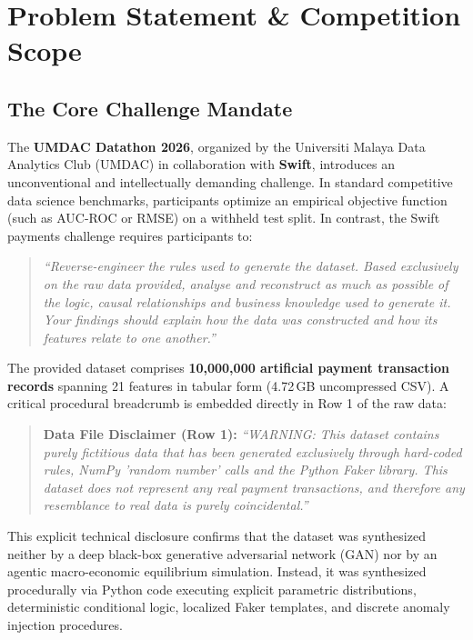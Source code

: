 \documentclass[11pt,a4paper]{article}
\begin{document}
\tableofcontents
\newpage

\section{Problem Statement \& Competition Scope}

\subsection{The Core Challenge Mandate}
The \textbf{UMDAC Datathon 2026}, organized by the Universiti Malaya Data Analytics Club (UMDAC) in collaboration with \textbf{Swift}, introduces an unconventional and intellectually demanding challenge. In standard competitive data science benchmarks, participants optimize an empirical objective function (such as AUC-ROC or RMSE) on a withheld test split. In contrast, the Swift payments challenge requires participants to:
\begin{quote}
\textit{``Reverse-engineer the rules used to generate the dataset. Based exclusively on the raw data provided, analyse and reconstruct as much as possible of the logic, causal relationships and business knowledge used to generate it. Your findings should explain how the data was constructed and how its features relate to one another.''}
\end{quote}

The provided dataset comprises \textbf{10,000,000 artificial payment transaction records} spanning 21 features in tabular form (4.72\,GB uncompressed CSV). A critical procedural breadcrumb is embedded directly in Row 1 of the raw data:
\begin{quote}
\textbf{Data File Disclaimer (Row 1):} \textit{``WARNING: This dataset contains purely fictitious data that has been generated exclusively through hard-coded rules, NumPy 'random number' calls and the Python Faker library. This dataset does not represent any real payment transactions, and therefore any resemblance to real data is purely coincidental.''}
\end{quote}
This explicit technical disclosure confirms that the dataset was synthesized neither by a deep black-box generative adversarial network (GAN) nor by an agentic macro-economic equilibrium simulation. Instead, it was synthesized procedurally via Python code executing explicit parametric distributions, deterministic conditional logic, localized Faker templates, and discrete anomaly injection procedures.
\end{document}
